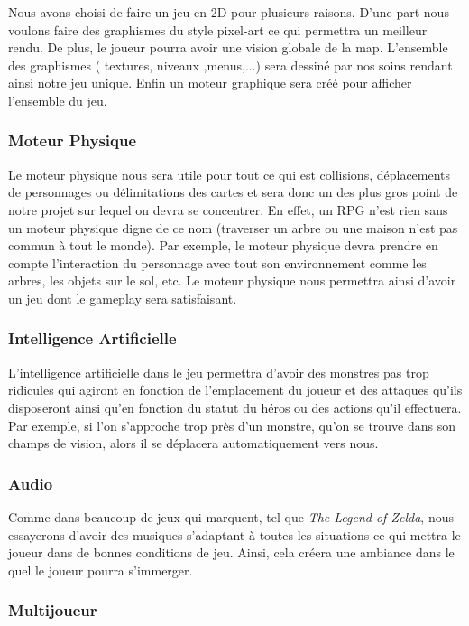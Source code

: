 \documentclass[12pt,a4paper]{article}
\begin{document}
Nous avons choisi de faire un jeu en 2D pour plusieurs raisons. D'une part nous voulons faire des graphismes du style pixel-art ce qui permettra un meilleur rendu. De plus, le joueur pourra avoir une vision globale de la map.
L'ensemble des graphismes ( textures, niveaux ,menus,...) sera dessiné par nos soins rendant ainsi notre jeu unique. 
Enfin un moteur graphique sera créé pour afficher l'ensemble du jeu.

\subsubsection{Moteur Physique}

Le moteur physique nous sera utile pour tout ce qui est collisions, déplacements de personnages ou délimitations des cartes et sera donc un des plus gros point de notre projet sur lequel on devra se concentrer. En effet, un RPG n'est rien sans un moteur physique digne de ce nom (traverser un arbre ou une maison n'est pas commun à tout le monde). Par exemple, le moteur physique devra prendre en compte l'interaction du personnage avec tout son environnement comme les arbres, les objets sur le sol, etc.
Le moteur physique nous permettra ainsi d'avoir un jeu dont le gameplay sera satisfaisant.

\subsubsection{Intelligence Artificielle}

L'intelligence artificielle dans le jeu permettra d'avoir des monstres pas trop ridicules qui agiront en fonction de l'emplacement du joueur et des attaques qu'ils disposeront ainsi qu'en fonction du statut du héros ou des actions qu'il effectuera. Par exemple, si l'on s'approche trop près d'un monstre, qu'on se trouve dans son champs de vision, alors il se déplacera automatiquement vers nous.\\


\subsubsection{Audio}

Comme dans beaucoup de jeux qui marquent, tel que\textit{ The Legend of Zelda}, nous essayerons d'avoir des musiques s'adaptant à toutes les situations ce qui mettra le joueur dans de bonnes conditions de jeu. Ainsi, cela créera une ambiance dans le quel le joueur pourra s'immerger.

\subsubsection{Multijoueur}
\end{document}

